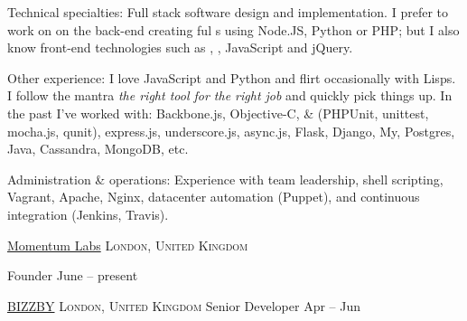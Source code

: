 \documentclass[10pt,a4paper]{article}
\begin{document}
\inlineheadsection  %
  {Technical specialties:}
  {Full stack software design and implementation. I prefer to work on on the back-end creating ful s using Node.JS, Python or PHP; but I also know front-end technologies such as , , JavaScript and jQuery.}

\inlineheadsection  %
  {Other experience:}
  {I love JavaScript and Python and flirt occasionally with Lisps. I follow the mantra \emph{the right tool for the right job} and quickly pick things up. In the past I've worked with: Backbone.js, Objective-C,  \&  (PHPUnit, unittest, mocha.js, qunit), express.js, underscore.js, async.js, Flask, Django, My, Postgres, Java, Cassandra, MongoDB, etc.}

\inlineheadsection  %
  {Administration \& operations:}
  {Experience with team leadership, shell scripting, Vagrant, Apache, Nginx, datacenter automation (Puppet), and continuous integration (Jenkins, Travis).}

\spacedhrule{1.5em}{-0.4em}


\headedsection  %
  {\href{http://www.momentumlabs.io}{Momentum Labs}}
  {\textsc{London, United Kingdom}} {%

  \headedsubsection  %
    {Founder}
    {June  -- present}
    {
  }
}

\headedsection
  {\href{http://www.bizzby.com}{BIZZBY}}
  {\textsc{London, United Kingdom}} {%
  \headedsubsection
    {Senior Developer}
    {Apr  -- Jun }
    {}
}
\end{document}
